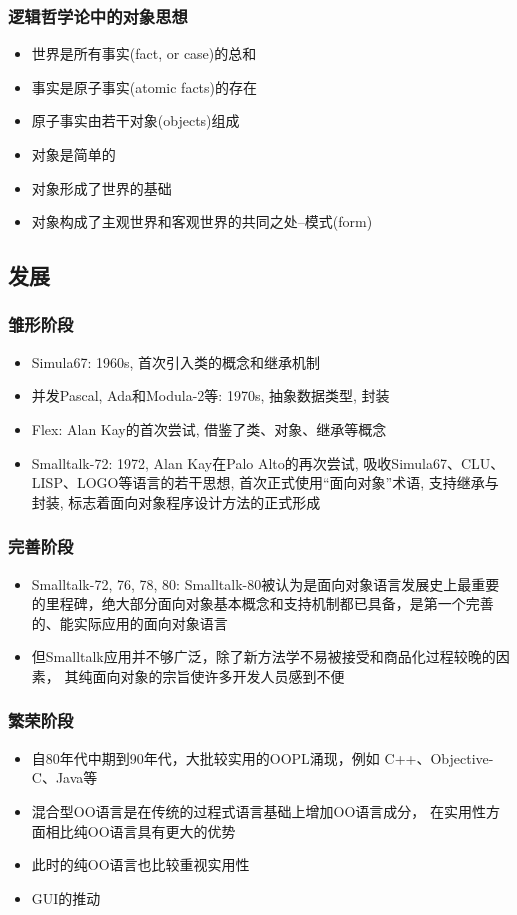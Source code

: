 \documentclass[compress]{beamer}
\begin{document}
\begin{frame}
  \frametitle{逻辑哲学论中的对象思想}

\begin{itemize}
\item 世界是所有事实(fact, or case)的总和
\item 事实是原子事实(atomic facts)的存在
\item 原子事实由若干对象(objects)组成
\item 对象是简单的 
\item 对象形成了世界的基础
\item 对象构成了主观世界和客观世界的共同之处--模式(form)
\end{itemize}

\end{frame}

\subsection{发展}

\begin{frame}
\frametitle{雏形阶段}
\begin{itemize}
\item Simula67: 1960s, 首次引入类的概念和继承机制
\item 并发Pascal, Ada和Modula-2等: 1970s, 抽象数据类型, 封装
\item Flex: Alan Kay的首次尝试, 借鉴了类、对象、继承等概念
\item Smalltalk-72: 1972, Alan Kay在Palo Alto的再次尝试, 
吸收Simula67、CLU、LISP、LOGO等语言的若干思想, 
首次正式使用“面向对象”术语, 支持继承与封装, 标志着面向对象程序设计方法的正式形成
\end{itemize}
\end{frame}

\begin{frame}
\frametitle{完善阶段}
\begin{itemize}
\item Smalltalk-72, 76, 78, 80: Smalltalk-80被认为是面向对象语言发展史上最重要的里程碑，绝大部分面向对象基本概念和支持机制都已具备，是第一个完善的、能实际应用的面向对象语言
\item 但Smalltalk应用并不够广泛，除了新方法学不易被接受和商品化过程较晚的因素，
其纯面向对象的宗旨使许多开发人员感到不便
\end{itemize}
\end{frame}

\begin{frame}
\frametitle{繁荣阶段}
\begin{itemize}
\item 自80年代中期到90年代，大批较实用的OOPL涌现，例如 C++、Objective-C、Java等
\item 混合型OO语言是在传统的过程式语言基础上增加OO语言成分，
在实用性方面相比纯OO语言具有更大的优势
\item 此时的纯OO语言也比较重视实用性
\item GUI的推动
\end{itemize}
\end{frame}
\end{document}

